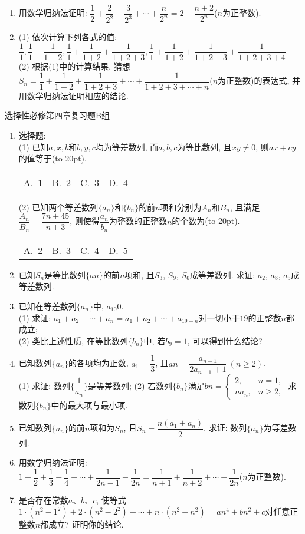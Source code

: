 \documentclass[10pt,a4paper]{article}
\newcommand{\bracket}[1]{(\hbox to #1pt{})}
\newcommand{\fourch}[4]{\par\begin{tabular}{p{.23\textwidth}p{.23\textwidth}p{.23\textwidth}p{.23\textwidth}}
A.~#1 &B.~#2& C.~#3& D.~#4
\end{tabular}}
\begin{document}
\begin{enumerate}[1.]
\vspace*{3cm}
\item 用数学归纳法证明: $\dfrac12+\dfrac2{2^2}+\dfrac3{2^3}+\cdots+\dfrac n{2^n}=2-\dfrac{n+2}{2^n}$($n$为正整数).
\vspace*{3cm}
\item (1) 依次计算下列各式的值: $\dfrac11,\dfrac11+\dfrac1{1+2},\dfrac11+\dfrac1{1+2}+\dfrac1{1+2+3},\dfrac11+\dfrac1{1+2}+\dfrac1{1+2+3}+\dfrac1{1+2+3+4}$.\\
(2) 根据(1)中的计算结果, 猜想$S_n=\dfrac11+\dfrac1{1+2}+\dfrac1{1+2+3}+\cdots+\dfrac1{1+2+3+\cdots+n}$($n$为正整数)的表达式, 并用数学归纳法证明相应的结论.
\vspace*{3cm}
\end{enumerate}

选择性必修第四章复习题B组

\begin{enumerate}[1.]

\item 选择题:\\
(1) 已知$a, x, b$和$b, y, c$均为等差数列, 而$a, b, c$为等比数列, 且$xy\ne 0$, 则$ax+cy$的值等于\bracket{20}.
\fourch{$1$}{$2$}{$3$}{$4$}
(2) 已知两个等差数列$\{a_n\}$和$\{b_n\}$的前$n$项和分别为$A_n$和$B_n$, 且满足$\dfrac{A_n}{B_n}=\dfrac{7n+45}{n+3}$, 则使得$\dfrac{a_n}{b_n}$为整数的正整数$n$的个数为\bracket{20}.
\fourch{$2$}{$3$}{$4$}{$5$}
\vspace*{3cm}
\item 已知$S_n$是等比数列$\{an\}$的前$n$项和, 且$S_3$, $S_9$, $S_6$成等差数列. 求证: $a_2$, $a_8$, $a_5$成等差数列.
\vspace*{3cm}
\item 已知在等差数列$\{a_n\}$中, $a_{10}0$.\\
(1) 求证: $a_1+a_2+\cdots+a_n=a_1+a_2+\cdots+a_{19-n}$对一切小于$19$的正整数$n$都成立;\\
(2) 类比上述性质, 在等比数列$\{b_n\}$中, 若$b_9=1$, 可以得到什么结论?
\vspace*{3cm}
\item 已知数列$\{a_n\}$的各项均为正数, $a_1=\dfrac 13$, 且$an=\dfrac{a_{n-1}}{2a_{n-1}+1} \ (n\ge 2)$.\\
(1) 求证: 数列$\{\dfrac 1{a_n}\}$是等差数列;
(2) 若数列$\{b_n\}$满足$bn=\begin{cases}2, & n=1,\\ na_n, & n \ge 2,\end{cases}$ 求数列$\{b_n\}$中的最大项与最小项.
\vspace*{3cm}
\item 已知数列$\{a_n\}$的前$n$项和为$S_n$, 且$S_n=\dfrac{n(a_1+a_n)}2$. 求证: 数列$\{a_n\}$为等差数列.
\vspace*{3cm}
\item 用数学归纳法证明: $1-\dfrac12+\dfrac 13-\dfrac 14+\cdots +\dfrac{1}{2n-1}-\dfrac{1}{2n}=\dfrac{1}{n+1}+\dfrac{1}{n+2}+\cdots+\dfrac{1}{2n}$($n$为正整数).
\vspace*{3cm}
\item 是否存在常数$a$、$b$、$c$, 使等式$1\cdot (n^2-1^2)+2\cdot (n^2-2^2)+\cdots +n\cdot (n^2-n^2)=an^4+bn^2+c$对任意正整数$n$都成立? 证明你的结论.
\vspace*{3cm}
\end{enumerate}
\end{document}
